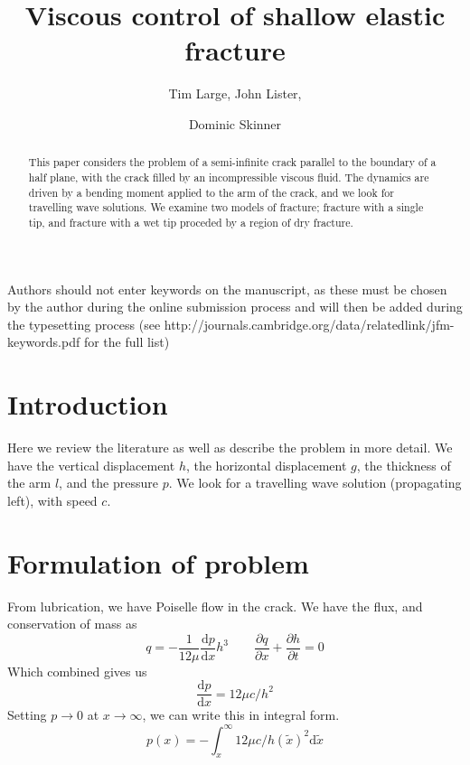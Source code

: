 \documentclass{jfm}
\title{Viscous control of shallow elastic fracture}
\author{Tim Large\aff{1},
  John Lister\aff{2},
 \and Dominic Skinner\aff{2}}
\affiliation{\aff{1} M.I.T., USA
\aff{2}Department of Applied Mathematics and Theoretical Physics, University of
Cambridge, UK}
\newcommand{\mrd}{\mathrm{d}}
\begin{document}
\maketitle

\begin{abstract}
This paper considers the problem of a semi-infinite crack parallel to the
boundary of a half plane, with the crack filled by an incompressible viscous
fluid. 
The dynamics are driven by a bending moment applied to the arm of the crack,
and we look for travelling wave solutions. We examine two models of fracture;
fracture with a single tip, and fracture with a wet tip proceded by a region
of dry fracture.
\end{abstract}

\begin{keywords}
Authors should not enter keywords on the manuscript, as these must be chosen by the author during the online submission process and will then be added during the typesetting process (see http://journals.cambridge.org/data/\linebreak[3]relatedlink/jfm-\linebreak[3]keywords.pdf for the full list)
\end{keywords}

\section{Introduction}\label{sec:introduction}
Here we review the literature as well as describe the problem in more detail.
We have the vertical displacement $h$, the horizontal displacement $g$, the
thickness of the arm $l$, and the pressure $p$.
We look for a travelling wave solution (propagating left), with speed $c$.
%
% 
\section{Formulation of problem}\label{sec:formulation_of_problem}
%
%
From lubrication, we have Poiselle flow in the crack. We have
the flux, and conservation of mass as 
\begin{equation}
q = - \frac{1}{12\mu}\frac{\mrd p}{\mrd x}h^3 \qquad
\frac{\partial q}{\partial x} + \frac{\partial h}{\partial t} = 0 
\end{equation}
Which combined gives us 
\begin{equation}
\frac{\mrd p}{\mrd x} = 12\mu c / h^2
\end{equation}
Setting $p\to 0$ at $x \to \infty$, we can write this in integral form.
\begin{equation}
p(x) = -\int_x^{\infty} 12\mu c / h(\tilde{x})^2 \mrd \tilde{x}
\end{equation}
\end{document}
